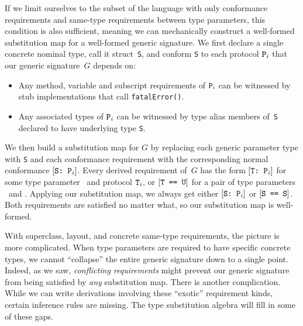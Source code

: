 \documentclass[../generics]{subfiles}
\begin{document}
If we limit ourselves to the subset of the language with only conformance requirements and same-type requirements between type parameters, this condition is also sufficient, meaning we can mechanically construct a well-formed substitution map for a well-formed generic signature. We first declare a single concrete nominal type, call it struct~\texttt{S}, and conform \texttt{S} to each protocol $\texttt{P}_i$ that our generic signature~$G$ depends on:
\begin{itemize}
\item Any method, variable and subscript requirements of $\texttt{P}_i$ can be witnessed by stub implementations that call \texttt{fatalError()}.
\item Any associated types of $\texttt{P}_i$ can be witnessed by type alias members of~\texttt{S} declared to have underlying type \texttt{S}.
\end{itemize}
We then build a substitution map for $G$ by replacing each generic parameter type with \texttt{S} and each conformance requirement with the corresponding normal conformance $[\texttt{S:~$\texttt{P}_i$}]$. Every derived requirement of~$G$ has the form $[\texttt{T:~$\texttt{P}_i$}]$ for some type parameter \tT\ and protocol $\texttt{T}_i$, or $[\texttt{T == U}]$ for a pair of type parameters \tT\ and \tU. Applying our substitution map, we always get either $[\texttt{S:~$\texttt{P}_i$}]$ or $[\texttt{S == S}]$. Both requirements are satisfied no matter what, so our substitution map is well-formed.

With superclass, layout, and concrete same-type requirements, the picture is more complicated. When type parameters are required to have specific concrete types, we cannot ``collapse'' the entire generic signature down to a single point. Indeed, as we saw, \emph{conflicting requirements} might prevent our generic signature from being satisfied by \emph{any} substitution map. There is another complication. While we can write derivations involving these ``exotic'' requirement kinds, certain inference rules are missing. The type substitution algebra will fill in some of these gaps.
\end{document}
